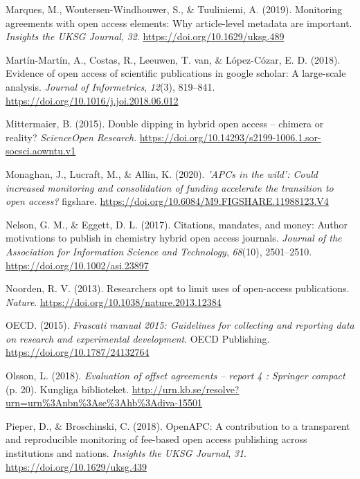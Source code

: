 \documentclass[a4paper,man,floatsintext,longtable,noextraspace,12pt]{apa6}
\newlength{\cslhangindent}
\newenvironment{cslreferences}%
  {\setlength{\parindent}{0pt}%
  \everypar{\setlength{\hangindent}{\cslhangindent}}\ignorespaces}%
  {\par}
\begin{document}
\begin{cslreferences}
\leavevmode\hypertarget{ref-Marques_2019}{}%
Marques, M., Woutersen-Windhouwer, S., \& Tuuliniemi, A. (2019).
Monitoring agreements with open access elements: Why article-level
metadata are important. \emph{Insights the UKSG Journal}, \emph{32}.
\url{https://doi.org/10.1629/uksg.489}

\leavevmode\hypertarget{ref-Mart_n_Mart_n_2018}{}%
Martín-Martín, A., Costas, R., Leeuwen, T. van, \& López-Cózar, E. D.
(2018). Evidence of open access of scientific publications in google
scholar: A large-scale analysis. \emph{Journal of Informetrics},
\emph{12}(3), 819--841. \url{https://doi.org/10.1016/j.joi.2018.06.012}

\leavevmode\hypertarget{ref-Mittermaier_2015}{}%
Mittermaier, B. (2015). Double dipping in hybrid open access -- chimera
or reality? \emph{ScienceOpen Research}.
\url{https://doi.org/10.14293/s2199-1006.1.sor-socsci.aowntu.v1}

\leavevmode\hypertarget{ref-Monaghan_2020}{}%
Monaghan, J., Lucraft, M., \& Allin, K. (2020). \emph{'APCs in the
wild': Could increased monitoring and consolidation of funding
accelerate the transition to open access?} figshare.
\url{https://doi.org/10.6084/M9.FIGSHARE.11988123.V4}

\leavevmode\hypertarget{ref-Nelson_2017}{}%
Nelson, G. M., \& Eggett, D. L. (2017). Citations, mandates, and money:
Author motivations to publish in chemistry hybrid open access journals.
\emph{Journal of the Association for Information Science and
Technology}, \emph{68}(10), 2501--2510.
\url{https://doi.org/10.1002/asi.23897}

\leavevmode\hypertarget{ref-Van_Noorden_2013}{}%
Noorden, R. V. (2013). Researchers opt to limit uses of open-access
publications. \emph{Nature}.
\url{https://doi.org/10.1038/nature.2013.12384}

\leavevmode\hypertarget{ref-Frascati}{}%
OECD. (2015). \emph{Frascati manual 2015: Guidelines for collecting and
reporting data on research and experimental development}. OECD
Publishing. \url{https://doi.org/10.1787/24132764}

\leavevmode\hypertarget{ref-Olsson1271866}{}%
Olsson, L. (2018). \emph{Evaluation of offset agreements -- report 4 :
Springer compact} (p. 20). Kungliga biblioteket.
\url{http://urn.kb.se/resolve?urn=urn\%3Anbn\%3Ase\%3Ahb\%3Adiva-15501}

\leavevmode\hypertarget{ref-Pieper_2018}{}%
Pieper, D., \& Broschinski, C. (2018). OpenAPC: A contribution to a
transparent and reproducible monitoring of fee-based open access
publishing across institutions and nations. \emph{Insights the UKSG
Journal}, \emph{31}. \url{https://doi.org/10.1629/uksg.439}


\end{cslreferences}
\end{document}
